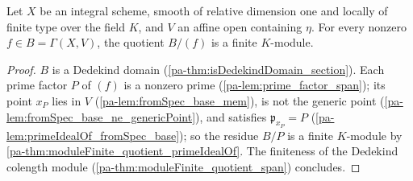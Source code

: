 \begin{theorem}
  \label{pa-thm:moduleFinite_quotient_span_section}
  \leanok

  Let \(X\) be an integral scheme, smooth of relative dimension one and locally of
  finite type over the field \(K\), and \(V\) an affine open containing \(\eta\).
  For every nonzero \(f \in B = \Gamma(X, V)\), the quotient \(B/(f)\) is a finite
  \(K\)-module.
\end{theorem}
\begin{proof}
  \leanok
  \(B\) is a Dedekind domain (\ref{pa-thm:isDedekindDomain_section}). Each prime factor
  \(P\) of \((f)\) is a nonzero prime (\ref{pa-lem:prime_factor_span}); its point
  \(x_P\) lies in \(V\) (\ref{pa-lem:fromSpec_base_mem}), is not the generic point
  (\ref{pa-lem:fromSpec_base_ne_genericPoint}), and satisfies
  \(\mathfrak p_{x_P} = P\) (\ref{pa-lem:primeIdealOf_fromSpec_base}); so the residue
  \(B/P\) is a finite \(K\)-module by
  \ref{pa-thm:moduleFinite_quotient_primeIdealOf}. The finiteness of the Dedekind
  colength module (\ref{pa-thm:moduleFinite_quotient_span}) concludes.
\end{proof}

